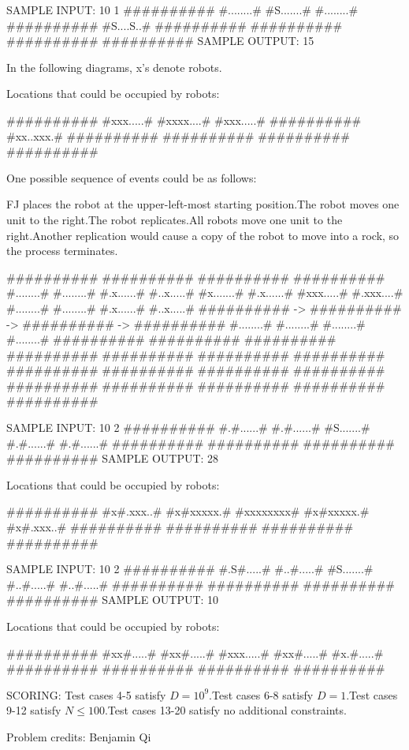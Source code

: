 \documentclass[12pt]{article}
\begin{document}
SAMPLE INPUT:
10 1
##########
#........#
#S.......#
#........#
##########
#S....S..#
##########
##########
##########
##########
SAMPLE OUTPUT: 
15

In the following diagrams, x's denote robots.

Locations that could be occupied by robots:


##########
#xxx.....#
#xxxx....#
#xxx.....#
##########
#xx..xxx.#
##########
##########
##########
##########

One possible sequence of events could be as follows:

FJ places the robot at the upper-left-most starting position.The robot moves one unit to the right.The robot replicates.All robots move one unit to the right.Another replication would cause a copy of the robot to move into a rock, so
the process terminates.

##########    ##########    ##########    ##########
#........#    #........#    #.x......#    #..x.....#
#x.......#    #.x......#    #xxx.....#    #.xxx....#
#........#    #........#    #.x......#    #..x.....#
########## -> ########## -> ########## -> ##########
#........#    #........#    #........#    #........#
##########    ##########    ##########    ##########
##########    ##########    ##########    ##########
##########    ##########    ##########    ##########
##########    ##########    ##########    ##########

SAMPLE INPUT:
10 2
##########
#.#......#
#.#......#
#S.......#
#.#......#
#.#......#
##########
##########
##########
##########
SAMPLE OUTPUT: 
28

Locations that could be occupied by robots:


##########
#x#.xxx..#
#x#xxxxx.#
#xxxxxxxx#
#x#xxxxx.#
#x#.xxx..#
##########
##########
##########
##########

SAMPLE INPUT:
10 2
##########
#.S#.....#
#..#.....#
#S.......#
#..#.....#
#..#.....#
##########
##########
##########
##########
SAMPLE OUTPUT: 
10

Locations that could be occupied by robots:


##########
#xx#.....#
#xx#.....#
#xxx.....#
#xx#.....#
#x.#.....#
##########
##########
##########
##########

SCORING:
Test cases 4-5 satisfy $D=10^9$.Test cases 6-8 satisfy $D=1$.Test cases 9-12 satisfy $N\le 100$.Test cases 13-20 satisfy no additional constraints.


Problem credits: Benjamin Qi
\end{document}
